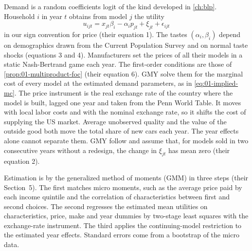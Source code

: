 Demand is a random coefficients logit of the kind developed in \cref{ch:blp}.
Household $i$ in year $t$ obtains from model $j$ the utility
\[
  u_{ijt} = x_{jt}\beta_i - \alpha_i p_{jt} + \xi_{jt} + \epsilon_{ijt}
\]
in our sign convention for price (their equation 1). The tastes $(\alpha_i, \beta_i)$ depend on demographics drawn
from the Current Population Survey and on normal taste shocks (equations 3 and 4). Manufacturers set the prices of
all their models in a static Nash-Bertrand game each year. The first-order conditions are those of
\cref{prop:01-multiproduct-foc} (their equation 6). GMY solve them for the marginal cost of every model at the
estimated demand parameters, as in \eqref{eq:01-implied-mc}. The price instrument is the real exchange rate of the
country where the model is built, lagged one year and taken from the Penn World Table. It moves with local labor
costs and with the nominal exchange rate, so it shifts the cost of supplying the US market. Average unobserved
quality and the value of the outside good both move the total share of new cars each year. The year effects alone
cannot separate them. GMY follow \citet{PakesBerryLevinsohn1993} and assume that, for models sold in two
consecutive years without a redesign, the change in $\xi_{jt}$ has mean zero (their equation 2).

Estimation is by the generalized method of moments (GMM) in three steps (their Section~5). The first matches micro moments, such as the average price paid
by each income quintile and the correlation of characteristics between first and second choices. The second
regresses the estimated mean utilities on characteristics, price, make and year dummies by two-stage least
squares with the exchange-rate instrument. The third applies the continuing-model restriction to the estimated
year effects. Standard errors come from a bootstrap of the micro data.

